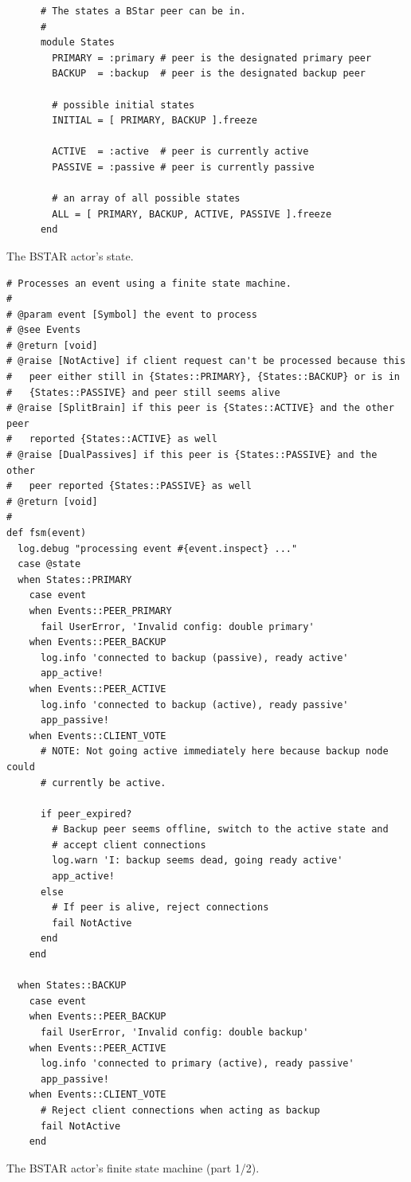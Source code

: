 \begin{listing}[H]
  \begin{verbatim}
      # The states a BStar peer can be in.
      #
      module States
        PRIMARY = :primary # peer is the designated primary peer
        BACKUP  = :backup  # peer is the designated backup peer

        # possible initial states
        INITIAL = [ PRIMARY, BACKUP ].freeze

        ACTIVE  = :active  # peer is currently active
        PASSIVE = :passive # peer is currently passive

        # an array of all possible states
        ALL = [ PRIMARY, BACKUP, ACTIVE, PASSIVE ].freeze
      end
  \end{verbatim}
	\caption{The BSTAR actor's state.}
  \label{lst:approach:bstar:states}
\end{listing}

\begin{listing}[H]
  \begin{verbatim}
# Processes an event using a finite state machine.
#
# @param event [Symbol] the event to process
# @see Events
# @return [void]
# @raise [NotActive] if client request can't be processed because this
#   peer either still in {States::PRIMARY}, {States::BACKUP} or is in
#   {States::PASSIVE} and peer still seems alive
# @raise [SplitBrain] if this peer is {States::ACTIVE} and the other peer
#   reported {States::ACTIVE} as well
# @raise [DualPassives] if this peer is {States::PASSIVE} and the other
#   peer reported {States::PASSIVE} as well
# @return [void]
#
def fsm(event)
  log.debug "processing event #{event.inspect} ..."
  case @state
  when States::PRIMARY
    case event
    when Events::PEER_PRIMARY
      fail UserError, 'Invalid config: double primary'
    when Events::PEER_BACKUP
      log.info 'connected to backup (passive), ready active'
      app_active!
    when Events::PEER_ACTIVE
      log.info 'connected to backup (active), ready passive'
      app_passive!
    when Events::CLIENT_VOTE
      # NOTE: Not going active immediately here because backup node could
      # currently be active.

      if peer_expired?
        # Backup peer seems offline, switch to the active state and
        # accept client connections
        log.warn 'I: backup seems dead, going ready active'
        app_active!
      else
        # If peer is alive, reject connections
        fail NotActive
      end
    end

  when States::BACKUP
    case event
    when Events::PEER_BACKUP
      fail UserError, 'Invalid config: double backup'
    when Events::PEER_ACTIVE
      log.info 'connected to primary (active), ready passive'
      app_passive!
    when Events::CLIENT_VOTE
      # Reject client connections when acting as backup
      fail NotActive
    end
  \end{verbatim}
	\caption{The BSTAR actor's finite state machine (part 1/2).}
  \label{lst:approach:bstar:fsm_1}
\end{listing}

